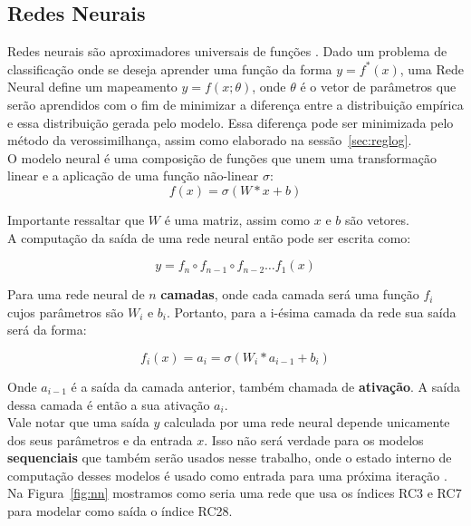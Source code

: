 \subsection{Redes Neurais}

\label{sec:nn}
Redes neurais são aproximadores universais de funções \citep{nnuni}. Dado um problema
de classificação onde se deseja aprender uma função da forma $y = f^*(x)$, uma
Rede Neural define um mapeamento $y = f(x ; \theta)$, onde $\theta$ é o vetor de
parâmetros que serão aprendidos com o fim de minimizar a diferença entre a
distribuição empírica e essa distribuição gerada pelo modelo. Essa diferença pode
ser minimizada pelo método da verossimilhança, assim como elaborado na sessão~\ref{sec:reglog}.\\

O modelo neural é uma composição de funções que unem uma transformação linear e
a aplicação de uma função não-linear $\sigma$: \\

\[ f(x)=  \sigma(W*x + b) \]

Importante ressaltar que $W$ é uma matriz, assim como $x$ e $b$ são vetores. \\

A computação da saída de uma rede neural então pode ser escrita como:

\[   y = f_n \circ f_{n-1} \circ f_{n-2} \dots f_1(x)  \]

Para uma rede neural de $n$ \textbf{camadas}, onde cada camada será uma função
$f_i$ cujos parâmetros são $W_i$ e $b_i$. Portanto, para a i-ésima camada da rede
sua saída será da forma: 

\[ f_i (x)=  a_i = \sigma(W_i*a_{i-1} + b_i) \]

Onde $a_{i-1}$ é a saída da camada anterior, também chamada de
\textbf{ativação}. A saída dessa camada é então a sua ativação $a_i$. \\ 

Vale notar que uma saída $y$ calculada por uma rede neural depende unicamente dos
seus parâmetros e da entrada $x$. Isso não será verdade para os modelos
\textbf{sequenciais} que também serão usados nesse trabalho, onde o estado
interno de computação desses modelos é usado como entrada para uma próxima
iteração \citep{dlbook}. \\

Na Figura~\ref{fig:nn} mostramos como seria uma rede que usa os índices RC3 e RC7 para
modelar como saída o índice RC28. \\  

